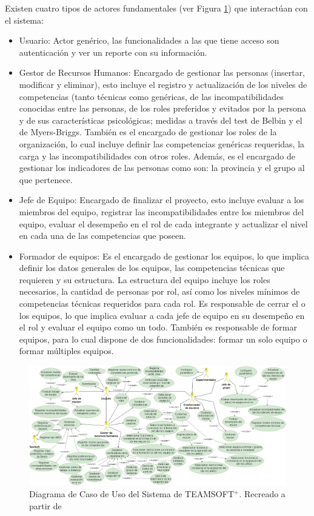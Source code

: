 Existen cuatro tipos de actores fundamentales (ver Figura \ref{fig:cuteamsoft}) que interactúan con el sistema:
\begin{itemize}
	\item Usuario: Actor genérico, las funcionalidades a las que tiene acceso son autenticación y ver un reporte con su información.
	
	\item Gestor de Recursos Humanos: Encargado de gestionar las personas (insertar, modificar y eliminar), esto incluye el registro y actualización de los niveles de competencias (tanto técnicas como genéricas, de las incompatibilidades conocidas entre las personas, de los roles preferidos y evitados por la persona y de sus características psicológicas; medidas a través del test de Belbin y el de Myers-Briggs. También es el encargado de gestionar los roles de la organización, lo cual incluye definir las competencias genéricas requeridas, la carga y las incompatibilidades con otros roles. Además, es el encargado de gestionar los indicadores de las personas como son: la provincia y el grupo al que pertenece.
	
	\item Jefe de Equipo: Encargado de finalizar el proyecto, esto incluye evaluar a los miembros del equipo, registrar las incompatibilidades entre los miembros del equipo, evaluar el desempeño en el rol de cada integrante y actualizar el nivel en cada una de las competencias que poseen.
	
	\item Formador de equipos: Es el encargado de gestionar los equipos, lo que implica definir los datos generales de los equipos, las competencias técnicas que requieren y su estructura. La estructura del equipo incluye los roles necesarios, la cantidad de personas por rol, así como los niveles mínimos de competencias técnicas requeridos para cada rol. Es responsable de cerrar el o los equipos, lo que implica evaluar a cada jefe de equipo en su desempeño en el rol y evaluar el equipo como un todo. También es responsable de formar equipos, para lo cual dispone de dos funcionalidades: formar un solo equipo o formar múltiples equipos.
\end{itemize}

\begin{figure}[H]
	\hspace{-1.5cm}
	\includegraphics[width=1.2\textwidth]{figuras/diagrama_CUTeamSoft.png} 
	\caption{Diagrama de Caso de Uso del Sistema de TEAMSOFT$^+$. Recreado a partir de \cite{Duran2019}}  \label{fig:cuteamsoft}
\end{figure}

